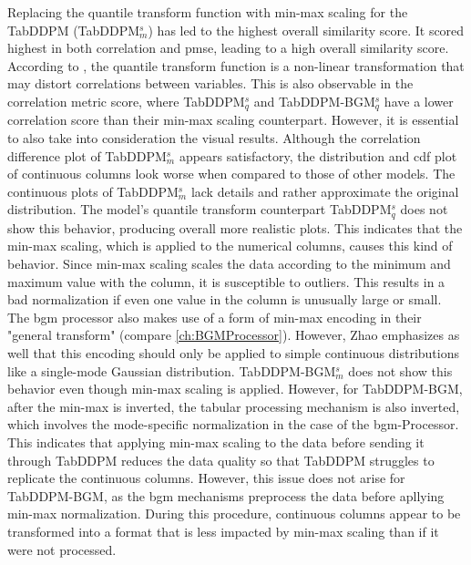 Replacing the quantile transform function with min-max scaling for the TabDDPM (TabDDPM$^{s}_m$) has led to the highest overall similarity score.
It scored highest in both correlation and \gls{pmse}, leading to a high overall similarity score.
According to \cite{scikit-learndevelopers2023QuantileTransformer}, the quantile transform function is a non-linear transformation that may distort correlations between variables.
This is also observable in the correlation metric score, where TabDDPM$^{s}_q$ and TabDDPM-BGM$^{s}_q$ have a lower correlation score than their min-max scaling counterpart.
However, it is essential to also take into consideration the visual results.
Although the correlation difference plot of TabDDPM$^{s}_m$ appears satisfactory, the distribution and \gls{cdf} plot of continuous columns look worse when compared to those of other models. 
The continuous plots of TabDDPM$^{s}_m$ lack details and rather approximate the original distribution.
The model's quantile transform counterpart TabDDPM$^{s}_q$ does not show this behavior, producing overall more realistic plots.
This indicates that the min-max scaling, which is applied to the numerical columns, causes this kind of behavior.
Since min-max scaling scales the data according to the minimum and maximum value with the column, it is susceptible to outliers.
This results in a bad normalization if even one value in the column is unusually large or small.
The \gls{bgm} processor also makes use of a form of min-max encoding in their "general transform" \cite[p. 7]{zhao2022CTABGANEnhancingTabular} (compare \autoref{ch:BGMProcessor}).
However, Zhao \etal \cite{zhao2022CTABGANEnhancingTabular} emphasizes as well that this encoding should only be applied to simple continuous distributions like a single-mode Gaussian distribution.
TabDDPM-BGM$^{s}_m$ does not show this behavior even though min-max scaling is applied. 
However, for TabDDPM-BGM, after the min-max is inverted, the tabular processing mechanism is also inverted, which involves the mode-specific normalization in the case of the \gls{bgm}-Processor.
This indicates that applying min-max scaling to the data before sending it through TabDDPM reduces the data quality so that TabDDPM struggles to replicate the continuous columns.
However, this issue does not arise for TabDDPM-BGM, as the \gls{bgm} mechanisms preprocess the data before apllying min-max normalization.
During this procedure, continuous columns appear to be transformed into a format that is less impacted by min-max scaling than if it were not processed.

